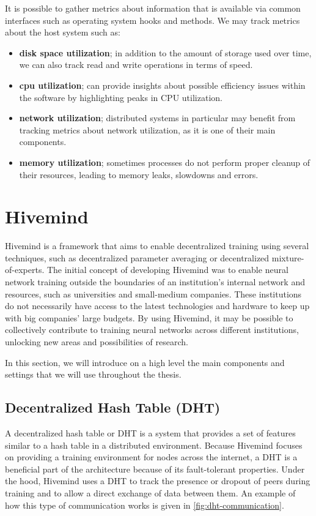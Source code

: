 It is possible to gather metrics about information that is available via common interfaces such as operating system hooks and methods.
We may track metrics about the host system such as:
\begin{itemize}
    \item \textbf{disk space utilization}; in addition to the amount of storage used over time, we can also track read and write operations in terms of speed.
    \item \textbf{cpu utilization}; can provide insights about possible efficiency issues within the software by highlighting peaks in CPU utilization.
    \item \textbf{network utilization}; distributed systems in particular may benefit from tracking metrics about network utilization, as it is one of their main components.
    \item \textbf{memory utilization}; sometimes processes do not perform proper cleanup of their resources, leading to memory leaks, slowdowns and errors.
\end{itemize}

\section{Hivemind}
Hivemind is a framework that aims to enable decentralized training using several techniques, such as decentralized parameter averaging or decentralized mixture-of-experts.
The initial concept of developing Hivemind was to enable neural network training outside the boundaries of an institution's internal network and resources, such as universities and small-medium companies.
These institutions do not necessarily have access to the latest technologies and hardware to keep up with big companies' large budgets.
By using Hivemind, it may be possible to collectively contribute to training neural networks across different institutions, unlocking new areas and possibilities of research.

In this section, we will introduce on a high level the main components and settings that we will use throughout the thesis.

\subsection{Decentralized Hash Table (DHT)}
A decentralized hash table or DHT is a system that provides a set of features similar to a hash table in a distributed environment.
Because Hivemind focuses on providing a training environment for nodes across the internet, a DHT is a beneficial part of the architecture because of its fault-tolerant properties.
Under the hood, Hivemind uses a DHT to track the presence or dropout of peers during training and to allow a direct exchange of data between them.
An example of how this type of communication works is given in \autoref{fig:dht-communication}.

